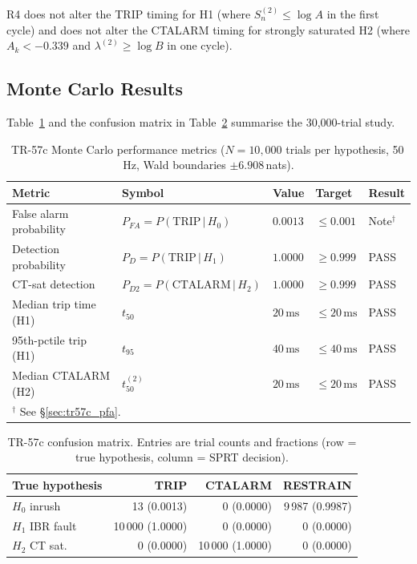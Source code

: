 \documentclass[11pt, a4paper]{article}
\newcommand{\ms}{\,\text{ms}}
\begin{document}
R4 does not alter the TRIP timing for H1 (where $S^{(2)}_n \leq \log A$
in the first cycle) and does not alter the CTALARM timing for strongly
saturated H2 (where $A_k < -0.339$ and $\lambda^{(2)} \geq \log B$ in
one cycle).

\subsection{Monte Carlo Results}

Table~\ref{tab:tr57c_metrics} and the confusion matrix in
Table~\ref{tab:tr57c_cm} summarise the 30{,}000-trial study.

\begin{table}[htbp]
  \centering
  \caption{TR-57c Monte Carlo performance metrics ($N=10{,}000$ trials per
    hypothesis, 50\,Hz, Wald boundaries $\pm6.908\,$nats).}
  \label{tab:tr57c_metrics}
  \begin{tabular}{lllll}
    \toprule
    \textbf{Metric} & \textbf{Symbol} & \textbf{Value}
      & \textbf{Target} & \textbf{Result} \\
    \midrule
    False alarm probability & $P_{FA}=P(\text{TRIP}\,|\,H_0)$
      & $0.0013$ & $\leq 0.001$ & Note$^\dagger$ \\
    Detection probability & $P_D=P(\text{TRIP}\,|\,H_1)$
      & $1.0000$ & $\geq 0.999$ & PASS \\
    CT-sat detection & $P_{D2}=P(\text{CTALARM}\,|\,H_2)$
      & $1.0000$ & $\geq 0.999$ & PASS \\
    Median trip time (H1) & $t_{50}$ & $20\ms$ & $\leq 20\ms$ & PASS \\
    95th-pctile trip (H1) & $t_{95}$ & $40\ms$ & $\leq 40\ms$ & PASS \\
    Median CTALARM (H2) & $t_{50}^{(2)}$ & $20\ms$ & $\leq 20\ms$ & PASS \\
    \bottomrule
    \multicolumn{5}{l}{\footnotesize $^\dagger$ See §\ref{sec:tr57c_pfa}.}
  \end{tabular}
\end{table}

\begin{table}[htbp]
  \centering
  \caption{TR-57c confusion matrix.  Entries are trial counts and
    fractions (row = true hypothesis, column = SPRT decision).}
  \label{tab:tr57c_cm}
  \begin{tabular}{lrrr}
    \toprule
    \textbf{True hypothesis} & \textbf{TRIP} & \textbf{CTALARM}
      & \textbf{RESTRAIN} \\
    \midrule
    $H_0$ inrush       & 13 (0.0013) &     0 (0.0000) & 9\,987 (0.9987) \\
    $H_1$ IBR fault    & 10\,000 (1.0000) & 0 (0.0000) &     0 (0.0000) \\
    $H_2$ CT sat.\ & 0 (0.0000) & 10\,000 (1.0000) &     0 (0.0000) \\
    \bottomrule
  \end{tabular}
\end{table}
\end{document}
